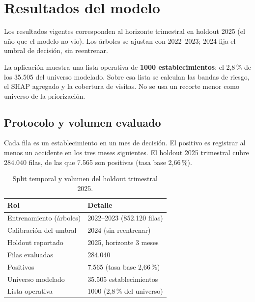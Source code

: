 
\section{Resultados del modelo}

Los resultados vigentes corresponden al horizonte trimestral en holdout 2025 (el a\~no que el modelo no vio).
Los \'arboles se ajustan con 2022--2023; 2024 fija el umbral de decisi\'on, sin reentrenar.

La aplicaci\'on muestra una lista operativa de \textbf{1000 establecimientos}: el 2,8\,\% de los 35.505 del universo modelado.
Sobre esa lista se calculan las bandas de riesgo, el SHAP agregado y la cobertura de visitas.
No se usa un recorte menor como universo de la priorizaci\'on.

\subsection*{Protocolo y volumen evaluado}

Cada fila es un establecimiento en un mes de decisi\'on.
El positivo es registrar al menos un accidente en los tres meses siguientes.
El holdout 2025 trimestral cubre 284.040 filas, de las que 7.565 son positivas (tasa base 2,66\,\%).

\begin{table}[htbp]
	\centering
	\caption{Split temporal y volumen del holdout trimestral 2025. \fuentepropia}
	\label{tab:holdout-split}
	\begin{tabular}{@{}ll@{}}
		\hline
		\textbf{Rol} & \textbf{Detalle} \\
		\hline
		Entrenamiento (\'arboles) & 2022--2023 (852.120 filas) \\
		Calibraci\'on del umbral & 2024 (sin reentrenar) \\
		Holdout reportado & 2025, horizonte 3 meses \\
		Filas evaluadas & 284.040 \\
		Positivos & 7.565 (tasa base 2,66\,\%) \\
		Universo modelado & 35.505 establecimientos \\
		Lista operativa & 1000 (2,8\,\% del universo) \\
		\hline
	\end{tabular}
\end{table}

